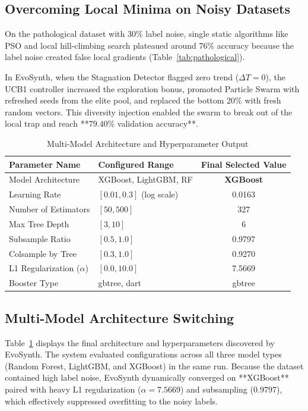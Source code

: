 \documentclass[conference]{IEEEtran}
\begin{document}
\subsection{Overcoming Local Minima on Noisy Datasets}
On the pathological dataset with 30\% label noise, single static algorithms like PSO and local hill-climbing search plateaued around 76\% accuracy because the label noise created false local gradients (Table~\ref{tab:pathological}). 

In EvoSynth, when the Stagnation Detector flagged zero trend ($\Delta T = 0$), the UCB1 controller increased the exploration bonus, promoted Particle Swarm with refreshed seeds from the elite pool, and replaced the bottom 20\% with fresh random vectors. This diversity injection enabled the swarm to break out of the local trap and reach **79.40\% validation accuracy**.

\begin{table}[htbp]
\caption{Multi-Model Architecture and Hyperparameter Output}
\label{tab:cash}
\centering
\begin{tabular}{llc}
\toprule
\textbf{Parameter Name} & \textbf{Configured Range} & \textbf{Final Selected Value} \\
\midrule
Model Architecture & XGBoost, LightGBM, RF & \textbf{XGBoost} \\
Learning Rate & $[0.01, 0.3]$ (log scale) & 0.0163 \\
Number of Estimators & $[50, 500]$ & 327 \\
Max Tree Depth & $[3, 10]$ & 6 \\
Subsample Ratio & $[0.5, 1.0]$ & 0.9797 \\
Colsample by Tree & $[0.3, 1.0]$ & 0.9270 \\
L1 Regularization ($\alpha$) & $[0.0, 10.0]$ & 7.5669 \\
Booster Type & gbtree, dart & gbtree \\
\bottomrule
\end{tabular}
\end{table}

\subsection{Multi-Model Architecture Switching}
Table~\ref{tab:cash} displays the final architecture and hyperparameters discovered by EvoSynth. The system evaluated configurations across all three model types (Random Forest, LightGBM, and XGBoost) in the same run. Because the dataset contained high label noise, EvoSynth dynamically converged on **XGBoost** paired with heavy L1 regularization ($\alpha = 7.5669$) and subsampling ($0.9797$), which effectively suppressed overfitting to the noisy labels.
\end{document}

